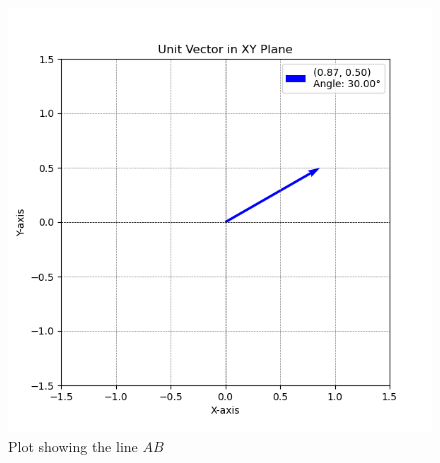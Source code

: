 \documentclass[journal]{IEEEtran}
\begin{document}
  \begin{figure}[h!]
    \centering
    \includegraphics[width=0.7\linewidth]{figs/figure1.png}
    \caption{Plot showing the line $AB$}
    \label{stemplot}
 \end{figure}
\end{document}

